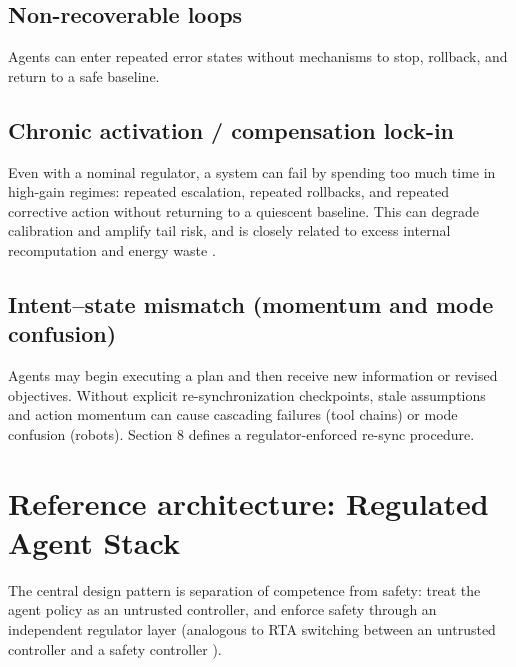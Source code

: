 \documentclass[11pt]{article}
\begin{document}
\subsection{Non-recoverable loops}
Agents can enter repeated error states without mechanisms to stop, rollback, and return to a safe
baseline.
\subsection{Chronic activation / compensation lock-in}
Even with a nominal regulator, a system can fail by spending too much time in high-gain regimes:
repeated escalation, repeated rollbacks, and repeated corrective action without returning to a
quiescent baseline. This can degrade calibration and amplify tail risk, and is closely related to
excess internal recomputation and energy waste \citep{jeffreys2026waste_energy,jeffreys2026two_regime_control}.
\subsection{Intent–state mismatch (momentum and mode confusion)}
Agents may begin executing a plan and then receive new information or revised objectives. Without
explicit re-synchronization checkpoints, stale assumptions and action momentum can cause cascading
failures (tool chains) or mode confusion (robots). Section 8 defines a regulator-enforced re-sync
procedure.
\section{Reference architecture: Regulated Agent Stack}
The central design pattern is separation of competence from safety: treat the agent policy as an
untrusted controller, and enforce safety through an independent regulator layer (analogous to RTA
switching between an untrusted controller and a safety controller \citep{miller2024rta_rl_iccps}).
\end{document}
